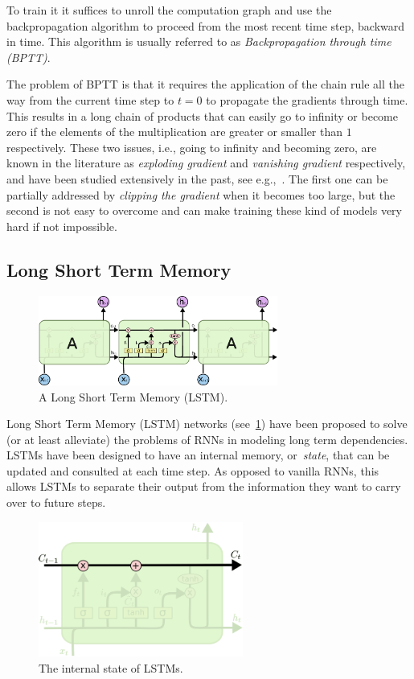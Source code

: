 To train it it suffices to unroll the computation graph and use the backpropagation algorithm to proceed from the most recent time step, backward in time. This algorithm is usually referred to as \emph{Backpropagation through time (BPTT)}.

The problem of BPTT is that it requires the application of the chain rule all the way from the current time step to $t = 0$ to propagate the gradients through time.  This results in a long chain of products that can easily go to
infinity or become zero if the elements of the multiplication are greater or smaller than $1$ respectively. These two issues, i.e., going to infinity and becoming zero, are known in the literature as \emph{exploding gradient} and \emph{vanishing gradient} respectively, and have been studied extensively in the past, see e.g.,~\cite{Bengio_94}. The first one can be partially addressed by \emph{clipping the gradient} when it becomes too large, but the second is not easy to overcome and can make training these kind of models very hard if not impossible.

\subsection{Long Short Term Memory}\label{sec:LSTM}
\begin{figure}[t]
	\centering
	\includegraphics[width=0.7\textwidth]{figures/LSTM.pdf}
	\caption{A Long Short Term Memory (LSTM).\label{fig:LSTM}}
\end{figure}

Long Short Term Memory (LSTM) networks (see~\ref{fig:LSTM}) have been proposed to solve (or at least alleviate) the problems of RNNs in modeling long term dependencies. LSTMs have been designed to have an internal memory, or~\emph{state}, that can be updated and consulted at each time step. As opposed to vanilla RNNs, this allows LSTMs to separate their output from the information they want to carry over to future steps.

\begin{figure}[t]
	\centering
	\includegraphics[width=0.6\textwidth]{figures/LSTM_state.pdf}
	\caption{The internal state of LSTMs.\label{fig:LSTM_state}}
\end{figure}

